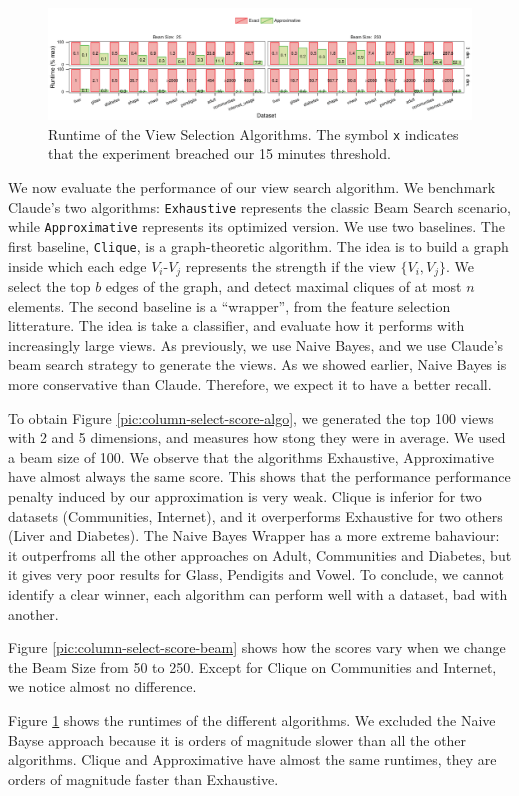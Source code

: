  
\begin{figure}[t!]
\centering
\includegraphics[width=\columnwidth]{plots/column-select-time}
\caption{Runtime of the View Selection Algorithms. The symbol \texttt{x}
indicates that the experiment breached our 15 minutes threshold.} 
\label{pic:column-select-time}
\end{figure}
We now evaluate the performance of our view search algorithm. We benchmark
Claude's two algorithms: \texttt{Exhaustive} represents the classic Beam Search
scenario, while \texttt{Approximative} represents its optimized version. We use
two baselines. The first baseline, \texttt{Clique}, is a graph-theoretic
algorithm. The idea is to build a graph inside which each edge $V_i$-$V_j$
represents the strength if the view  $\{V_i, V_j\}$. We select the top $b$
edges of the graph, and detect maximal cliques of at most $n$ elements. The
second baseline is a ``wrapper'', from the feature selection litterature. The
idea is take a classifier, and evaluate how it performs with increasingly large
views. As previously, we use Naive Bayes, and we use Claude's beam search
strategy to generate the views. As we showed earlier, Naive Bayes is
more conservative than Claude. Therefore, we expect it to have a better recall.

To obtain Figure \ref{pic:column-select-score-algo}, we generated the top 100
views with 2 and 5 dimensions, and measures how stong they were in average. We
used a beam size of 100.  We observe that the algorithms Exhaustive,
Approximative have almost always the same score. This shows that the
performance performance penalty induced by our approximation is very weak.
Clique is inferior for two datasets (Communities, Internet), and it
overperforms Exhaustive for two others (Liver and Diabetes). The Naive Bayes
Wrapper has a more extreme bahaviour: it outperfroms all the other approaches
on Adult, Communities and Diabetes, but it gives very poor results for Glass,
Pendigits and Vowel. To conclude, we cannot identify a clear winner, each
algorithm can perform well with a dataset, bad with another.

Figure \ref{pic:column-select-score-beam} shows how the scores vary when we
change the Beam Size from 50 to 250. Except for Clique on Communities and
Internet, we notice almost no difference.


Figure \ref{pic:column-select-time} shows the runtimes of the different
algorithms. We excluded the Naive Bayse approach because it is orders of
magnitude slower than all the other algorithms.  Clique and Approximative have
almost the same runtimes, they are orders of magnitude faster than Exhaustive.
